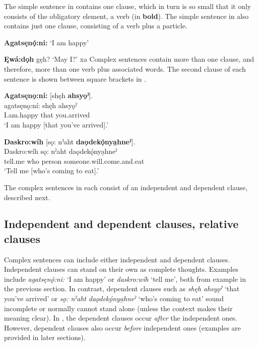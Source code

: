 The simple sentence in  contains one clause, which in turn is so small that it only consists of the obligatory element, a verb (in \textbf{bold}). The simple sentence in  also contains just one clause, consisting of a verb  plus a particle.
 
\ea\label{ex:sentencetypeex}
\ea \textbf{Agatsęnǫ́:ni:} ‘I am happy’\label{ex:sentencetypeexa}

\ex \textbf{Ęwá:dǫh} gęh? ‘May I?’\label{ex:sentencetypeexb}
\z
\z
xa 
Complex sentences contain more than one clause, and therefore, more than one verb plus associated words. The second clause of each sentence is shown between square brackets in . 

\ea\label{ex:subordsentex}
\ea \textbf{Agatsęnǫ:ní:} [shęh \textbf{ahsyǫˀ}].\\\label{ex:subordsentexa}
\gll agatsęnǫ:ní: shęh ahsyǫˀ  \\
I.am.happy that you.arrived\\
\glt ‘I am happy [that you’ve arrived].’

\ex \textbf{Daskro:wíh} [sǫ: nˀaht \textbf{daǫdekǫ́nya̱hneˀ}].\\\label{ex:subordsentexb}
\gll Daskro:wíh sǫ: nˀaht daǫdekǫ́nya̱hneˀ\\
tell.me who person someone.will.come.and.eat\\
\glt ‘Tell me [who’s coming to eat].’
\z
\z 

The complex sentences in  each consist of an independent and dependent clause, described next. 

\subsection{Independent and dependent clauses, relative clauses} \label{Independent and dependent clauses, relative clauses}
Complex sentences can include either independent and dependent clauses. Independent clauses can stand on their own as complete thoughts. Examples include \textit{agatsęnǫ́:ni:} ‘I am happy’ or \textit{daskro:wíh} ‘tell me’, both from example  in the previous section. In contrast, dependent clauses such as \textit{shęh ahsyǫˀ} ‘that you’ve arrived’  or \textit{sǫ: nˀaht daǫdekǫ́nya̱hneˀ} ‘who’s coming to eat’  sound incomplete or normally cannot stand alone (unless the context makes their meaning clear). In , the dependent clauses occur \emph{after} the independent ones. However, dependent clauses also occur \emph{before} independent ones (examples are provided in later sections). 


